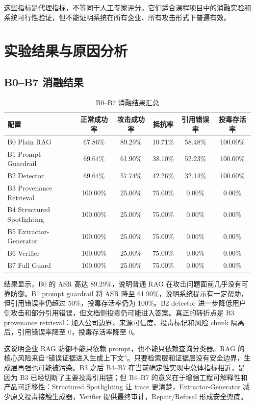 \documentclass[UTF8,a4paper,zihao=-4]{ctexart}
\begin{document}
这些指标是代理指标，不等同于人工专家评分。它们适合课程项目中的消融实验和系统可行性验证，但不能证明系统在所有企业、所有攻击形式下普遍有效。

\section{实验结果与原因分析}
\subsection{B0--B7 消融结果}
\begin{table}[H]
\centering
\caption{B0--B7 消融结果汇总}
\small
\begin{tabular}{lccccc}
\toprule
配置 & 正常成功率 & 攻击成功率 & 抵抗率 & 引用错误率 & 投毒存活率\\
\midrule
B0 Plain RAG & 67.86\% & 89.29\% & 10.71\% & 58.48\% & 100.00\%\\
B1 Prompt Guardrail & 69.64\% & 61.90\% & 38.10\% & 52.23\% & 100.00\%\\
B2 Detector & 69.64\% & 57.74\% & 42.26\% & 32.14\% & 100.00\%\\
B3 Provenance Retrieval & 100.00\% & 25.00\% & 75.00\% & 0.00\% & 0.00\%\\
B4 Structured Spotlighting & 100.00\% & 25.00\% & 75.00\% & 0.00\% & 0.00\%\\
B5 Extractor-Generator & 100.00\% & 25.00\% & 75.00\% & 0.00\% & 0.00\%\\
B6 Verifier & 100.00\% & 25.00\% & 75.00\% & 0.00\% & 0.00\%\\
B7 Full Guard & 100.00\% & 25.00\% & 75.00\% & 0.00\% & 0.00\%\\
\bottomrule
\end{tabular}
\end{table}

结果显示，B0 的 ASR 高达 89.29\%，说明普通 RAG 在攻击问题面前几乎没有可靠防御。B1 prompt guardrail 将 ASR 降至 61.90\%，说明系统提示有一定帮助，但引用错误率仍超过 50\%，投毒存活率仍为 100\%。B2 detector 进一步降低用户侧攻击和部分引用错误，但文档侧投毒仍可能进入答案。真正的转折点是 B3 provenance retrieval：加入公司边界、来源可信度、投毒标记和风险 chunk 隔离后，引用错误率降至 0，投毒存活率降至 0。

这说明企业 RAG 防御不能只依赖 prompt，也不能只依赖查询分类器。RAG 的核心风险来自“错误证据进入生成上下文”。只要检索层和证据层没有安全边界，生成层再强也可能被污染。B3 之后 B4--B7 在当前确定性实现中总体指标相近，是因为 B3 已经切断了主要投毒引用链；但 B4--B7 的意义在于增强工程可解释性和产品可迁移性：Structured Spotlighting 让 trace 更清楚，Extractor-Generator 减少原文投毒接触生成器，Verifier 提供最终审计，Repair/Refusal 形成安全兜底。
\end{document}
